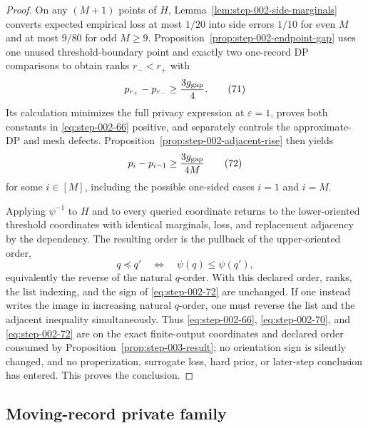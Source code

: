 \begin{proof}
On any \((M+1)\) points of \(H\), Lemma~\ref{lem:step-002-side-marginals} converts expected empirical loss at most \(1/20\) into side errors \(1/10\) for even \(M\) and at most \(9/80\) for odd \(M\ge 9\). Proposition~\ref{prop:step-002-endpoint-gap} uses one unused threshold-boundary point and exactly two one-record DP comparisons to obtain ranks \(r_-<r_+\) with
\[
p_{r_+}-p_{r_-}\ge\frac{3g_{\rm gap}}4.
\tag{71}\label{eq:step-002-71}
\]
Its calculation minimizes the full privacy expression at \(\varepsilon=1\), proves both constants in \eqref{eq:step-002-66} positive, and separately controls the approximate-DP and mesh defects. Proposition~\ref{prop:step-002-adjacent-rise} then yields
\[
p_i-p_{i-1}\ge\frac{3g_{\rm gap}}{4M}
\tag{72}\label{eq:step-002-72}
\]
for some \(i \in [M]\), including the possible one-sided cases \(i=1\) and \(i=M\).

Applying \(\psi^{-1}\) to \(H\) and to every queried coordinate returns to the lower-oriented threshold coordinates with identical marginals, loss, and replacement adjacency by the dependency. The resulting order is the pullback of the upper-oriented order,
\[
q\preceq q'
\quad\Longleftrightarrow\quad
\psi(q)\le\psi(q'),
\]
equivalently the reverse of the natural \(q\)-order. With this declared order, ranks, the list indexing, and the sign of \eqref{eq:step-002-72} are unchanged. If one instead writes the image in increasing natural \(q\)-order, one must reverse the list and the adjacent inequality simultaneously. Thus \eqref{eq:step-002-66}, \eqref{eq:step-002-70}, and \eqref{eq:step-002-72} are on the exact finite-output coordinates and declared order consumed by Proposition~\ref{prop:step-003-result}; no orientation sign is silently changed, and no properization, surrogate loss, hard prior, or later-step conclusion has entered. This proves the conclusion.

\end{proof}

\subsection{Moving-record private family}
\label{app:step-003}

